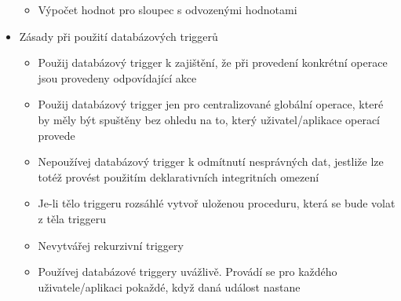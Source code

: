\documentclass[a4paper,10pt]{article}
\begin{document}
\begin{itemize}
\begin{itemize}
					\item Výpočet hodnot pro sloupec s odvozenými hodnotami
				\end{itemize}
				\item Zásady při použití databázových triggerů
				\begin{itemize}
					\item Použij databázový trigger k zajištění, že při provedení konkrétní operace jsou provedeny odpovídající akce
					\item Použij databázový trigger jen pro centralizované globální operace, které by měly být spuštěny bez ohledu na to, který uživatel/aplikace operací provede
					\item Nepoužívej databázový trigger k odmítnutí nesprávných dat, jestliže lze totéž provést použitím deklarativních integritních omezení
					\item Je-li tělo triggeru rozsáhlé vytvoř uloženou proceduru, která se bude volat z těla triggeru
					\item Nevytvářej rekurzivní triggery
					\item Používej databázové triggery uvážlivě. Provádí se pro každého uživatele/aplikaci pokaždé, když daná událost nastane
				\end{itemize}				
			\end{itemize}
			
\end{document}
